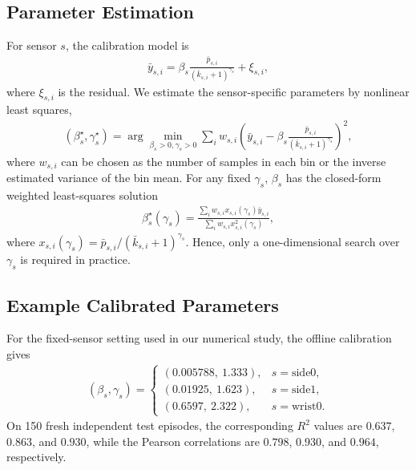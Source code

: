 \documentclass[lettersize,journal]{IEEEtran}
\theoremstyle{custom}
\begin{document}
\subsection{Parameter Estimation}
For sensor $s$, the calibration model is
\begin{align}\label{eq:cal_fit}
    \bar y_{s,i}
    =\beta_s\frac{\bar p_{s,i}}{(\bar k_{s,i}+1)^{\gamma_s}}+\xi_{s,i},
\end{align}
where $\xi_{s,i}$ is the residual. We estimate the sensor-specific parameters by nonlinear least squares,
\begin{align}\label{eq:cal_nls}
    (\beta_s^\star,\gamma_s^\star)
    =\arg\min_{\beta_s>0,\gamma_s>0}
    \sum_i w_{s,i}
    \left(
    \bar y_{s,i}-
    \beta_s\frac{\bar p_{s,i}}{(\bar k_{s,i}+1)^{\gamma_s}}
    \right)^2,
\end{align}
where $w_{s,i}$ can be chosen as the number of samples in each bin or the inverse estimated variance of the bin mean. For any fixed $\gamma_s$, $\beta_s$ has the closed-form weighted least-squares solution
\begin{align}\label{eq:beta_closed}
    \beta_s^\star(\gamma_s)
    =\frac{\sum_i w_{s,i}x_{s,i}(\gamma_s)\bar y_{s,i}}
    {\sum_i w_{s,i}x_{s,i}^2(\gamma_s)},
\end{align}
where $x_{s,i}(\gamma_s)=\bar p_{s,i}/(\bar k_{s,i}+1)^{\gamma_s}$. Hence, only a one-dimensional search over $\gamma_s$ is required in practice.

\subsection{Example Calibrated Parameters}
For the fixed-sensor setting used in our numerical study, the offline calibration gives
\begin{align}
(\beta_s,\gamma_s)=
\begin{cases}
(0.005788,\ 1.333), & s=\mathrm{side0},\\
(0.01925,\ 1.623), & s=\mathrm{side1},\\
(0.6597,\ 2.322), & s=\mathrm{wrist0}.
\end{cases}\label{eq:fitted_params}
\end{align}
On 150 fresh independent test episodes, the corresponding $R^2$ values are $0.637$, $0.863$, and $0.930$, while the Pearson correlations are $0.798$, $0.930$, and $0.964$, respectively.
\end{document}
